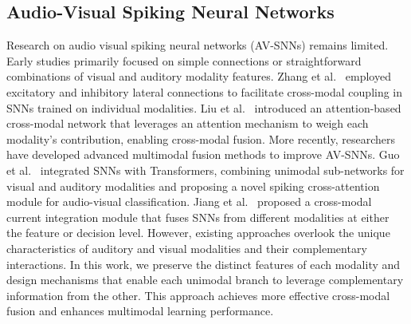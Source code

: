 \subsection{Audio-Visual Spiking Neural Networks}
Research on audio visual spiking neural networks (AV-SNNs) remains limited. Early studies primarily focused on simple connections or straightforward combinations of visual and auditory modality features. Zhang et al.~\cite{zhang2020efficient} employed excitatory and inhibitory lateral connections to facilitate cross-modal coupling in SNNs trained on individual modalities. Liu et al.~\cite{liu2022event} introduced an attention-based cross-modal network that leverages an attention mechanism to weigh each modality's contribution, enabling cross-modal fusion.
More recently, researchers have developed advanced multimodal fusion methods to improve AV-SNNs. Guo et al.~\cite{guo2023transformer} integrated SNNs with Transformers, combining unimodal sub-networks for visual and auditory modalities and proposing a novel spiking cross-attention module for audio-visual classification. Jiang et al.~\cite{jiang2023cmci} proposed a cross-modal current integration module that fuses SNNs from different modalities at either the feature or decision level.
However, existing approaches overlook the unique characteristics of auditory and visual modalities and their complementary interactions. In this work, we preserve the distinct features of each modality and design mechanisms that enable each unimodal branch to leverage complementary information from the other. This approach achieves more effective cross-modal fusion and enhances multimodal learning performance.